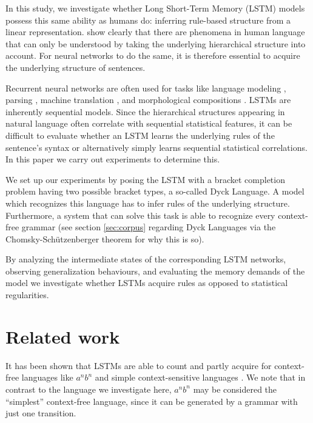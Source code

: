 \documentclass[11pt,a4paper]{article}
\begin{document}
In this study, we investigate whether Long Short-Term Memory (LSTM) models \cite{hochreiter1997long} possess this same ability as humans do: inferring rule-based structure from a linear representation. \citeauthor{everaert2015structures}  show clearly that there are phenomena in human language that can only be understood by taking the underlying hierarchical structure into account. For neural networks to do the same, it is therefore essential to acquire the underlying structure of sentences.

Recurrent neural networks are often used for tasks like language modeling \cite{mikolov2010recurrent, sundermeyer2012lstm}, parsing \cite{vinyals2015grammar, kiperwasser2016simple, dyer2016recurrent}, machine translation \cite{bahdanau2014neural}, and morphological compositions \cite{kim2016character}. LSTMs are inherently sequential models. Since the hierarchical structures appearing in natural language often correlate with sequential statistical features, it can be difficult to evaluate whether an LSTM learns the underlying rules of the sentence's syntax or alternatively simply learns sequential statistical correlations.  In this paper we carry out experiments to determine this.

We set up our experiments by posing the LSTM with a bracket completion problem having two possible bracket types, a so-called Dyck Language. A model which recognizes this language has to infer rules of the underlying structure. Furthermore, a system that can solve this task is able to recognize every context-free grammar (see section \ref{sec:corpus} regarding Dyck Languages via the Chomsky-Sch\"utzenberger theorem for why this is so).

By analyzing the intermediate states of the corresponding LSTM networks, observing generalization behaviours, and evaluating the memory demands of the model we investigate whether LSTMs acquire rules as opposed to statistical regularities.

\section{Related work}
It has been shown that LSTMs are able to count and partly acquire for context-free languages like $a^nb^n$ and simple context-sensitive languages \cite{gers2001lstm, rodriguez2001simple}. We note that in contrast to the language we investigate here, $a^nb^n$ may be considered the ``simplest'' context-free language, since it can be generated by a grammar with just one transition.
\end{document}
